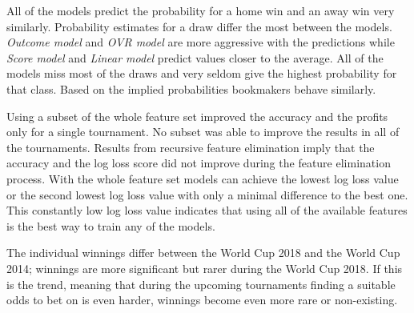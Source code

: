 All of the models predict the probability for a home win and an away win very similarly. Probability estimates for a draw differ the most between the models. \textit{Outcome model} and \textit{OVR model} are more aggressive with the predictions while \textit{Score model} and \textit{Linear model} predict values closer to the average. All of the models miss most of the draws and very seldom give the highest probability for that class. Based on the implied probabilities bookmakers behave similarly.

Using a subset of the whole feature set improved the accuracy and the profits only for a single tournament. No subset was able to improve the results in all of the tournaments. Results from recursive feature elimination imply that the accuracy and the log loss score did not improve during the feature elimination process. With the whole feature set models can achieve the lowest log loss value or the second lowest log loss value with only a minimal difference to the best one. This constantly low log loss value indicates that using all of the available features is the best way to train any of the models.

The individual winnings differ between the World Cup 2018 and the World Cup 2014; winnings are more significant but rarer during the World Cup 2018. If this is the trend, meaning that during the upcoming tournaments finding a suitable odds to bet on is even harder, winnings become even more rare or non-existing.
